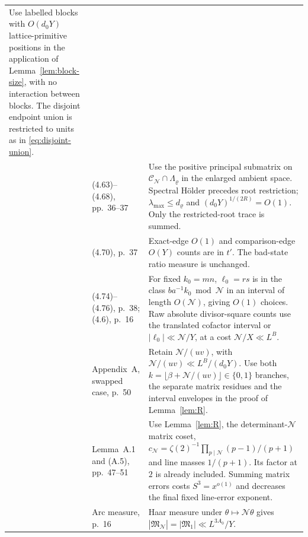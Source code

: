 \documentclass[11pt]{article}
\theoremstyle{definition}
\newcommand{\GN}{\mathcal N}
\newcommand{\CC}{\mathcal C}
\newcommand{\MN}{\mathfrak M_{\GN}}
\newcommand{\Mone}{\mathfrak M_1}
\theoremstyle{remark}
\numberwithin{equation}{section}
\begin{document}
\begin{longtable}{@{}>{\raggedright\arraybackslash}p{}>{\raggedright\arraybackslash}p{}>{\raggedright\arraybackslash}p{}@{}}
Use labelled blocks with $O(d_0Y)$ lattice-primitive positions in the
application of Lemma~\ref{lem:block-size}, with no interaction between
blocks. The disjoint endpoint union is restricted to units as in
\eqref{eq:disjoint-union}.\\
18\label{dict:18}&(4.63)--(4.68), pp.~36--37&
Use the positive principal submatrix on
$\CC_{\GN}\cap\Lambda_\varrho$ in the enlarged ambient space.
Spectral H\"older precedes root restriction;
$\lambda_{\max}\le d_\varrho$ and $(d_0Y)^{1/(2R)}=O(1)$.
Only the restricted-root trace is summed.\\
19\label{dict:19}&(4.70), p.~37&
Exact-edge $O(1)$ and comparison-edge $O(Y)$ counts are in $t'$.
The bad-state ratio measure is unchanged.\\
20\label{dict:20}&(4.74)--(4.76), p.~38; (4.6), p.~16&
For fixed $k_0=mn$, $\ell_0=rs$ is in the class
$ba^{-1}k_0\bmod\GN$ in an interval of length $O(\GN)$, giving
$O(1)$ choices. Raw absolute divisor-square counts use the translated
cofactor interval or $|\ell_0|\ll\GN/Y$, at a cost $\GN/X\ll L^B$.\\
21\label{dict:21}&Appendix~A, swapped case, p.~50&
Retain $\GN/(uv)$, with $\GN/(uv)\ll L^B/(d_0Y)$.
Use both $k=\lfloor\beta+\GN/(uv)\rfloor\in\{0,1\}$ branches,
the separate matrix residues and the interval envelopes in the proof
of Lemma~\ref{lem:R}.\\
22\label{dict:22}&Lemma~A.1 and (A.5), pp.~47--51&
Use Lemma~\ref{lem:R}, the determinant-$\GN$ matrix coset,
$c_{\GN}=\zeta(2)^{-1}\prod_{p\mid\GN}(p-1)/(p+1)$ and
line masses $1/(p+1)$. Its factor at $2$ is already included.
Summing matrix errors costs $S^3=x^{o(1)}$ and decreases the final
fixed line-error exponent.\\
23\label{dict:23}&Arc measure, p.~16&
Haar measure under $\theta\mapsto\GN\theta$ gives
$|\MN|=|\Mone|\ll L^{3A_0}/Y$.\\
\bottomrule
\end{longtable}
\normalsize
\end{document}
